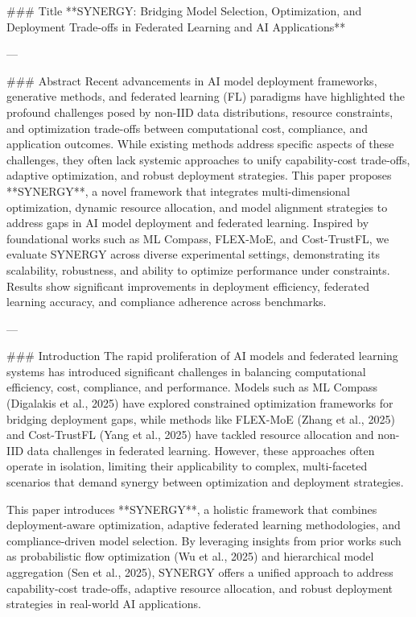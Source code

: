 ### Title  
**SYNERGY: Bridging Model Selection, Optimization, and Deployment Trade-offs in Federated Learning and AI Applications**

---

### Abstract  
Recent advancements in AI model deployment frameworks, generative methods, and federated learning (FL) paradigms have highlighted the profound challenges posed by non-IID data distributions, resource constraints, and optimization trade-offs between computational cost, compliance, and application outcomes. While existing methods address specific aspects of these challenges, they often lack systemic approaches to unify capability-cost trade-offs, adaptive optimization, and robust deployment strategies. This paper proposes **SYNERGY**, a novel framework that integrates multi-dimensional optimization, dynamic resource allocation, and model alignment strategies to address gaps in AI model deployment and federated learning. Inspired by foundational works such as ML Compass, FLEX-MoE, and Cost-TrustFL, we evaluate SYNERGY across diverse experimental settings, demonstrating its scalability, robustness, and ability to optimize performance under constraints. Results show significant improvements in deployment efficiency, federated learning accuracy, and compliance adherence across benchmarks.  

---

### Introduction  
The rapid proliferation of AI models and federated learning systems has introduced significant challenges in balancing computational efficiency, cost, compliance, and performance. Models such as ML Compass (Digalakis et al., 2025) have explored constrained optimization frameworks for bridging deployment gaps, while methods like FLEX-MoE (Zhang et al., 2025) and Cost-TrustFL (Yang et al., 2025) have tackled resource allocation and non-IID data challenges in federated learning. However, these approaches often operate in isolation, limiting their applicability to complex, multi-faceted scenarios that demand synergy between optimization and deployment strategies.  

This paper introduces **SYNERGY**, a holistic framework that combines deployment-aware optimization, adaptive federated learning methodologies, and compliance-driven model selection. By leveraging insights from prior works such as probabilistic flow optimization (Wu et al., 2025) and hierarchical model aggregation (Sen et al., 2025), SYNERGY offers a unified approach to address capability-cost trade-offs, adaptive resource allocation, and robust deployment strategies in real-world AI applications.

